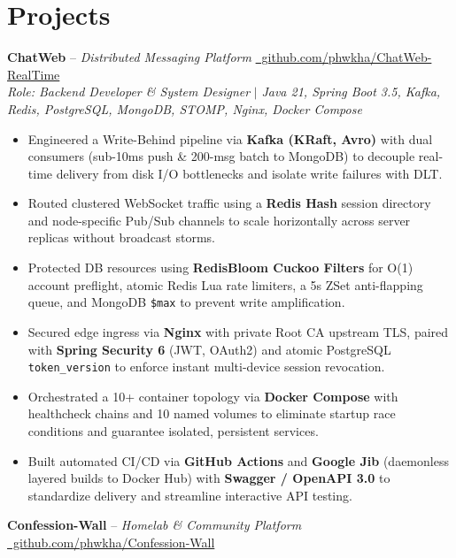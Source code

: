 \documentclass[a4paper,10pt]{article}
\begin{document}
\section{Projects}
\vspace{3pt}
\textbf{ChatWeb} -- \textit{Distributed Messaging Platform} \hfill \href{https://github.com/phwkha/ChatWeb-RealTime}{\faGithub\ github.com/phwkha/ChatWeb-RealTime} \\
\vspace{2pt}
\textit{Role: Backend Developer \& System Designer} $\vert$ \textit{Java 21, Spring Boot 3.5, Kafka, Redis, PostgreSQL, MongoDB, STOMP, Nginx, Docker Compose}
\begin{itemize}[leftmargin=0.2in, itemsep=1.5pt, topsep=2pt]
    \item Engineered a Write-Behind pipeline via \textbf{Kafka (KRaft, Avro)} with dual consumers (sub-10ms push \& 200-msg batch to MongoDB) to decouple real-time delivery from disk I/O bottlenecks and isolate write failures with DLT.
    \item Routed clustered WebSocket traffic using a \textbf{Redis Hash} session directory and node-specific Pub/Sub channels to scale horizontally across server replicas without broadcast storms.
    \item Protected DB resources using \textbf{RedisBloom Cuckoo Filters} for O(1) account preflight, atomic Redis Lua rate limiters, a 5s ZSet anti-flapping queue, and MongoDB \texttt{\$max} to prevent write amplification.
    \item Secured edge ingress via \textbf{Nginx} with private Root CA upstream TLS, paired with \textbf{Spring Security 6} (JWT, OAuth2) and atomic PostgreSQL \texttt{token\_version} to enforce instant multi-device session revocation.
    \item Orchestrated a 10+ container topology via \textbf{Docker Compose} with healthcheck chains and 10 named volumes to eliminate startup race conditions and guarantee isolated, persistent services.
    \item Built automated CI/CD via \textbf{GitHub Actions} and \textbf{Google Jib} (daemonless layered builds to Docker Hub) with \textbf{Swagger / OpenAPI 3.0} to standardize delivery and streamline interactive API testing.
\end{itemize}
\vspace{5pt}
\textbf{Confession-Wall} -- \textit{Homelab \& Community Platform} \hfill \href{https://github.com/phwkha/Confession-Wall}{\faGithub\ github.com/phwkha/Confession-Wall} \\
\end{document}
